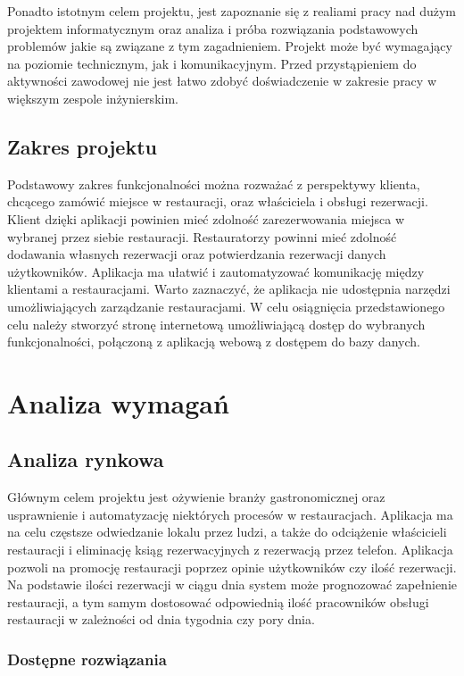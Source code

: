 \documentclass{article}
\begin{document}
Ponadto istotnym celem projektu, jest zapoznanie się z realiami pracy nad dużym projektem informatycznym oraz analiza i próba rozwiązania podstawowych problemów jakie są związane z tym zagadnieniem. Projekt może być wymagający na poziomie technicznym, jak i komunikacyjnym. Przed przystąpieniem do aktywności zawodowej nie jest łatwo zdobyć doświadczenie w zakresie pracy w większym zespole inżynierskim.
\subsection{Zakres projektu}
Podstawowy zakres funkcjonalności można rozważać z perspektywy klienta, chcącego zamówić miejsce w restauracji, oraz właściciela i obsługi rezerwacji. Klient dzięki aplikacji powinien mieć zdolność zarezerwowania miejsca w wybranej przez siebie restauracji. Restauratorzy powinni mieć zdolność dodawania własnych rezerwacji oraz potwierdzania rezerwacji danych użytkowników. Aplikacja ma ułatwić i zautomatyzować komunikację między klientami a restauracjami. Warto zaznaczyć, że aplikacja nie udostępnia narzędzi umożliwiających zarządzanie restauracjami. W celu osiągnięcia przedstawionego celu należy stworzyć stronę internetową umożliwiającą dostęp do wybranych funkcjonalności, połączoną z aplikacją webową z dostępem do bazy danych.



\section{Analiza wymagań}

\subsection{Analiza rynkowa}
Głównym celem projektu jest ożywienie branży gastronomicznej oraz usprawnienie i automatyzację niektórych procesów w restauracjach. Aplikacja ma na celu częstsze odwiedzanie lokalu przez ludzi, a także do odciążenie właścicieli restauracji i eliminację ksiąg rezerwacyjnych z rezerwacją przez telefon. Aplikacja pozwoli na promocję restauracji poprzez opinie użytkowników czy ilość rezerwacji. Na podstawie ilości rezerwacji w ciągu dnia system może prognozować zapełnienie restauracji, a tym samym dostosować odpowiednią ilość pracowników obsługi restauracji w zależności od dnia tygodnia czy pory dnia. 

\subsubsection{Dostępne rozwiązania}
\end{document}
